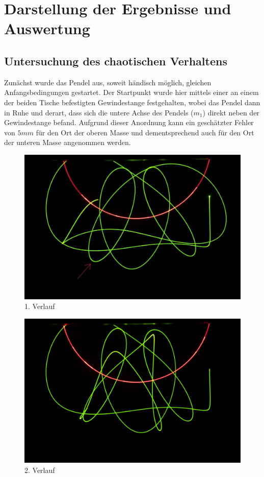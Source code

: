 \section{Darstellung der Ergebnisse und Auswertung}

\subsection{Untersuchung des chaotischen Verhaltens}
Zunächst wurde das Pendel aus, soweit händisch möglich, gleichen Anfangsbedingungen gestartet. Der Startpunkt wurde hier mittels einer an einem der beiden Tische befestigten Gewindestange festgehalten, wobei das Pendel dann in Ruhe und derart, dass sich die untere Achse des Pendels ($ m_{1} $) direkt neben der Gewindestange befand. Aufgrund dieser Anordnung kann ein geschätzter Fehler von $ 5  mm $ für den Ort der oberen Masse und dementsprechend auch für den Ort der unteren Masse angenommen werden.


\begin{figure}
        \includegraphics[width=.9\textwidth]{images/pendel-6_.jpg}
\caption{1. Verlauf}
\label{pendel-6}
\end{figure}

\begin{figure}
        \includegraphics[width=.9\textwidth]{images/pendel-10.jpg}
\caption{2. Verlauf}
\label{pendel-10}
\end{figure}

